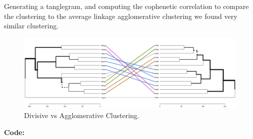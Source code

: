 \documentclass[12pt]{article}
\makeatletter
\theoremstyle{homework}
\newenvironment{exercise}[1]
{\def\@currentlabel{#1}\exercisecore}
{\endexercisecore}
\makeatother
\begin{document}
\begin{exercise}{4}
\begin{enumerate}
    Generating a tanglegram, and computing the cophenetic correlation to compare the clustering to the average linkage agglomerative clustering we found very similar clustering. 
    \begin{figure}[H]
      \begin{center}
        \caption{Divisive vs Agglomerative Clustering.}
      \includegraphics[width = .70\textwidth]{Rplot12.png}
      \end{center}
    \end{figure}

      \textbf{Code:}
      \begin{center}
      
      \end{center}
    \end{enumerate}
\end{exercise}

\vspace{.5in}
\end{document}
